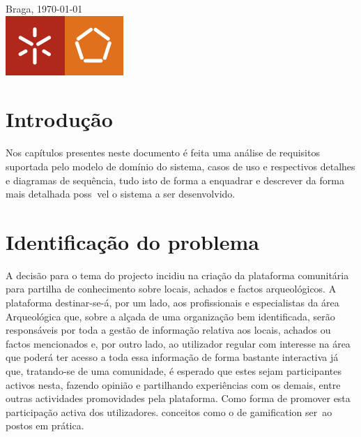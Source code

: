 ﻿\documentclass[12pt,a4paper]{article}
\begin{document}
\begin{titlepage}
Braga, {\large \today}\\[1cm] %


\includegraphics[scale=1]{escola_eng.png}\\[0cm] %
 

\vfill %

\end{titlepage}
\thispagestyle{empty}
\newpage

\tableofcontents
\newpage
\onehalfspacing

\section{Introdução}
Nos capítulos presentes neste documento é feita uma análise de requisitos suportada
pelo modelo de domínio do sistema, casos de uso e respectivos detalhes e diagramas de
sequência, tudo isto de forma a enquadrar e descrever da forma mais detalhada possvel o
sistema a ser desenvolvido.


\newpage

\section{Identificação do problema}
A decisão para o tema do projecto incidiu na criação da plataforma comunitária para partilha de conhecimento sobre locais, achados e factos arqueológicos. A plataforma destinar-se-á, por um lado, aos profissionais e especialistas da área Arqueológica que, sobre a alçada de uma organização bem identificada, serão responsáveis por toda a gestão de informação relativa aos locais, achados ou factos mencionados e, por outro lado, ao utilizador regular com interesse na área que poderá ter acesso a toda essa informação de forma bastante interactiva já que, tratando-se de uma comunidade, é esperado que estes sejam participantes activos nesta, fazendo opinião e partilhando experiências com os demais, entre outras actividades promovidades pela plataforma. Como forma de promover esta participação activa dos utilizadores. conceitos como o de gamification ser~ao postos em
prática.
\end{document}
